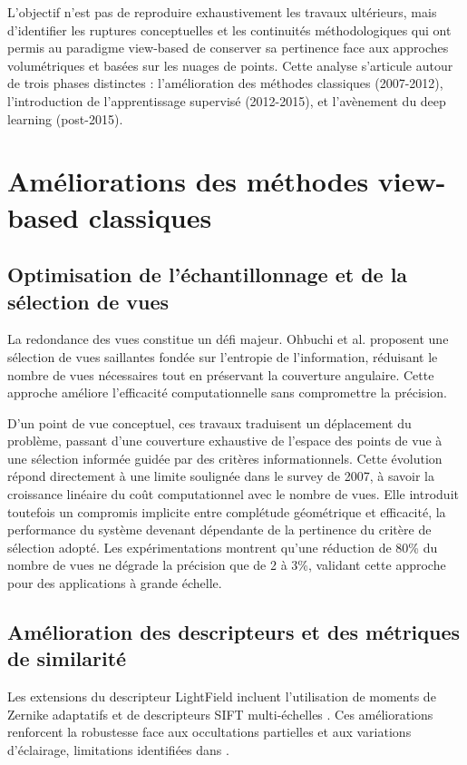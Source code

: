 \documentclass[11pt,a4paper,oneside]{report}
\begin{document}
L'objectif n'est pas de reproduire exhaustivement les travaux ultérieurs, mais d'identifier les ruptures conceptuelles et les continuités méthodologiques qui ont permis au paradigme view-based de conserver sa pertinence face aux approches volumétriques et basées sur les nuages de points. Cette analyse s'articule autour de trois phases distinctes : l'amélioration des méthodes classiques (2007-2012), l'introduction de l'apprentissage supervisé (2012-2015), et l'avènement du deep learning (post-2015).

\section{Améliorations des méthodes view-based classiques}

\subsection{Optimisation de l'échantillonnage et de la sélection de vues}

La redondance des vues constitue un défi majeur. Ohbuchi et al. \cite{ohbuchi2003salient} proposent une sélection de vues saillantes fondée sur l'entropie de l'information, réduisant le nombre de vues nécessaires tout en préservant la couverture angulaire. Cette approche améliore l'efficacité computationnelle sans compromettre la précision.

D'un point de vue conceptuel, ces travaux traduisent un déplacement du problème, passant d'une couverture exhaustive de l'espace des points de vue à une sélection informée guidée par des critères informationnels. Cette évolution répond directement à une limite soulignée dans le survey de 2007, à savoir la croissance linéaire du coût computationnel avec le nombre de vues. Elle introduit toutefois un compromis implicite entre complétude géométrique et efficacité, la performance du système devenant dépendante de la pertinence du critère de sélection adopté. Les expérimentations montrent qu'une réduction de 80\% du nombre de vues ne dégrade la précision que de 2 à 3\%, validant cette approche pour des applications à grande échelle.

\subsection{Amélioration des descripteurs et des métriques de similarité}

Les extensions du descripteur LightField incluent l'utilisation de moments de Zernike adaptatifs et de descripteurs SIFT multi-échelles \cite{papadakis2010panorama}. Ces améliorations renforcent la robustesse face aux occultations partielles et aux variations d'éclairage, limitations identifiées dans \cite{tangelder2007survey}.
\end{document}
